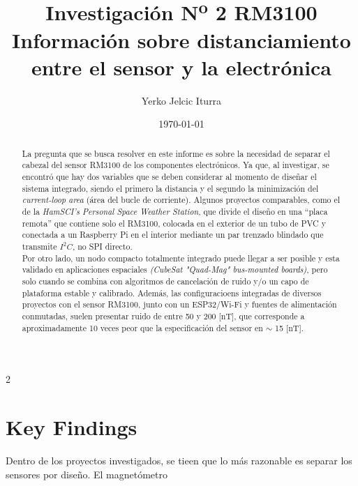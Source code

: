 \documentclass[11pt,letterpaper]{article}
\title{
    Investigación N\textsuperscript{o} 2 RM3100 \\
    \large Información sobre distanciamiento entre el sensor y la electrónica
}
\author{Yerko Jelcic Iturra}
\date{\today}
\begin{document}
\maketitle

\begin{abstract}
La pregunta que se busca resolver en este informe es sobre la necesidad de separar el cabezal del sensor RM3100 de los componentes electrónicos.
Ya que, al investigar, se encontró que hay dos variables que se deben considerar al momento de diseñar el sistema integrado, siendo el primero la distancia y el segundo la minimización del \textit{current-loop area} (área del bucle de corriente). Algunos proyectos comparables, como el de la \textit{HamSCI's Personal Space Weather Station}, que divide el diseño en una ``placa remota'' que contiene solo el RM3100, colocada en el exterior de un tubo de PVC y conectada a un Raspberry Pi en el interior mediante un par trenzado blindado que transmite $I^2C$, no SPI directo.\\
Por otro lado, un nodo compacto totalmente integrado puede llegar a ser posible y esta validado en aplicaciones espaciales \textit{(CubeSat "Quad-Mag" bus-mounted boards)}, pero solo cuando se combina con algoritmos de cancelación de ruido y/o un capo de plataforma estable y calibrado. Además, las configuracioens integradas de diversos proyectos con el sensor RM3100, junto con un ESP32/Wi-Fi y fuentes de alimentación conmutadas, suelen presentar ruido de entre 50 y 200 [nT], que corresponde a aproximadamente 10 veces peor que la especificación del sensor en $\sim$ 15 [nT].
\end{abstract}

\begin{multicols}{2}

\section{Key Findings}
Dentro de los proyectos investigados, se tieen que lo más razonable es separar los sensores por diseño. El magnetómetro 


\end{multicols}
\end{document}
